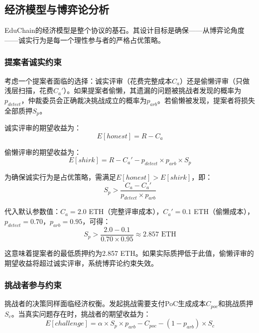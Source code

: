\documentclass[10.5pt,compsoc]{CjC}
\begin{document}
\subsection{经济模型与博弈论分析}

EduChain的经济模型是整个协议的基石。其设计目标是确保——从博弈论角度——诚实行为是每一个理性参与者的严格占优策略。

\subsubsection{提案者诚实约束}

考虑一个提案者面临的选择：诚实评审（花费完整成本$C_a$）还是偷懒评审（只做浅层扫描，花费$C_a'$）。如果提案者偷懒，其遗漏的问题被挑战者发现的概率为$p_{detect}$，仲裁委员会正确裁决挑战成立的概率为$p_{arb}$。若偷懒被发现，提案者将损失全部质押$S_p$。

诚实评审的期望收益为：
\begin{equation}
E[honest] = R - C_a
\end{equation}

偷懒评审的期望收益为：
\begin{equation}
E[shirk] = R - C_a' - p_{detect} \times p_{arb} \times S_p
\end{equation}

为确保诚实行为是占优策略，需满足$E[honest] > E[shirk]$，即：
\begin{equation}
S_p > \frac{C_a - C_a'}{p_{detect} \times p_{arb}}
\label{eq:min_stake}
\end{equation}

代入默认参数值：$C_a = 2.0$ ETH（完整评审成本），$C_a' = 0.1$ ETH（偷懒成本），$p_{detect} = 0.70$，$p_{arb} = 0.95$，可得：
\begin{equation}
S_p > \frac{2.0 - 0.1}{0.70 \times 0.95} \approx 2.857 \text{ ETH}
\end{equation}

这意味着提案者的最低质押约为2.857 ETH。如果实际质押低于此值，偷懒评审的期望收益将超过诚实评审，系统博弈论约束失效。

\subsubsection{挑战者参与约束}

挑战者的决策同样面临经济权衡。发起挑战需要支付PoC生成成本$C_{poc}$和挑战质押$S_c$。当真实问题存在时，挑战者的期望收益为：
\begin{equation}
E[challenge] = \alpha \times S_p \times p_{arb} - C_{poc} - (1 - p_{arb}) \times S_c
\end{equation}
\end{document}
